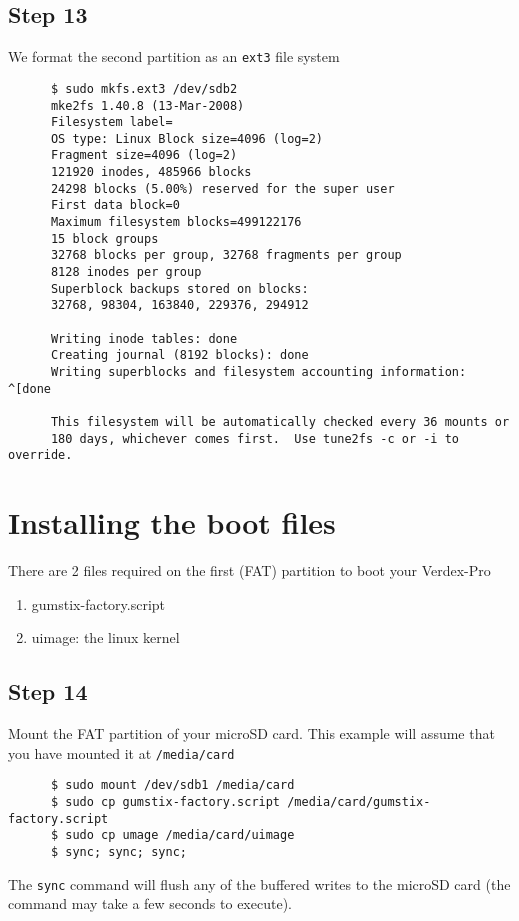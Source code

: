 \documentclass{article}
\begin{document}
   \subsection{Step 13}
      We format the second partition as an \texttt{ext3} file system
      \begin{verbatim} 
      $ sudo mkfs.ext3 /dev/sdb2 
      mke2fs 1.40.8 (13-Mar-2008) 
      Filesystem label= 
      OS type: Linux Block size=4096 (log=2) 
      Fragment size=4096 (log=2) 
      121920 inodes, 485966 blocks 
      24298 blocks (5.00%) reserved for the super user 
      First data block=0 
      Maximum filesystem blocks=499122176 
      15 block groups 
      32768 blocks per group, 32768 fragments per group 
      8128 inodes per group 
      Superblock backups stored on blocks:  
      32768, 98304, 163840, 229376, 294912 

      Writing inode tables: done                             
      Creating journal (8192 blocks): done 
      Writing superblocks and filesystem accounting information: ^[done 

      This filesystem will be automatically checked every 36 mounts or 
      180 days, whichever comes first.  Use tune2fs -c or -i to override. 
      \end{verbatim}
   \section{Installing the boot files}
      There are 2 files required on the first (FAT) partition to boot your
      Verdex-Pro
      \begin{enumerate}
      \item gumstix-factory.script
      \item uimage: the linux kernel
      \end{enumerate}
   \subsection{Step 14}
      Mount the FAT partition of your microSD card. This example will assume
      that you have mounted it at \texttt{/media/card} 
      \begin{verbatim}
      $ sudo mount /dev/sdb1 /media/card 
      $ sudo cp gumstix-factory.script /media/card/gumstix-factory.script 
      $ sudo cp umage /media/card/uimage 
      $ sync; sync; sync; 
      \end{verbatim}
      The \texttt{sync} command will flush any of the buffered writes to the
      microSD card (the command may take a few seconds to execute). 
\end{document}
